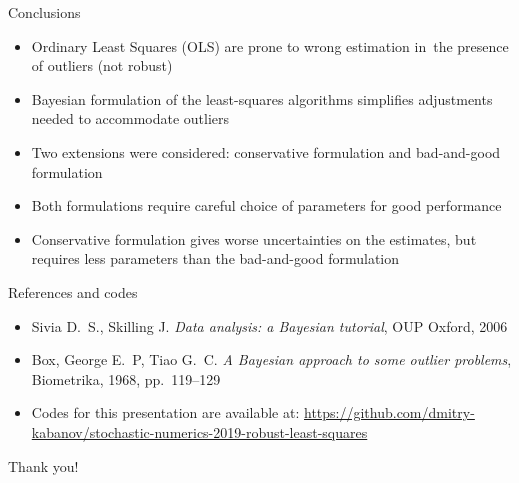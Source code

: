 \documentclass{beamer}
\begin{document}
\begin{frame}{Conclusions}
\begin{itemize}
    \item Ordinary Least Squares (OLS) are prone to wrong estimation 
    in~the presence of outliers (not robust)
    \item Bayesian formulation of the least-squares algorithms simplifies
    adjustments needed to accommodate outliers
    \item Two extensions were considered: conservative formulation and
    bad-and-good formulation
    \item Both formulations require careful choice of parameters for good
    performance
    \item Conservative formulation gives worse uncertainties on the estimates,
    but requires less parameters than the bad-and-good formulation
\end{itemize}
\end{frame}


\begin{frame}{References and codes}
\begin{itemize}
    \item Sivia D.\ S., Skilling J. \emph{Data analysis: a Bayesian tutorial},
    OUP Oxford, 2006
    \item Box, George E.\ P, Tiao G.\ C.
    \emph{A Bayesian approach to some outlier problems},
    Biometrika, 1968, pp.\ 119--129
    \item Codes for this presentation are available at: 
    \url{https://github.com/dmitry-kabanov/stochastic-numerics-2019-robust-least-squares}
\end{itemize}
\end{frame}

\begin{frame}[standout]
\Huge
Thank you!
\end{frame}
\end{document}
